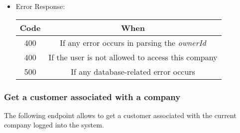 \begin{itemize}
    \item Error Response:
    \begin{table}[!h]
    \centering 
    \begin{tabular}{|c|c|}
    \hline
    \multicolumn{1}{|c|}{\textbf{Code}} & \multicolumn{1}{c|}{\textbf{When}} \\ \hline
    400 & If any error occurs in parsing the \textit{ownerId}  \\\hline
    400 & If the user is not allowed to access this company \\\hline
    500 & If any database-related error occurs \\\hline
    \end{tabular} 
    \end{table} 
    
\end{itemize}


\newpage
\subsubsection*{Get a customer associated with a company}

The following endpoint allows to get a customer associated with the current company logged into the system.

